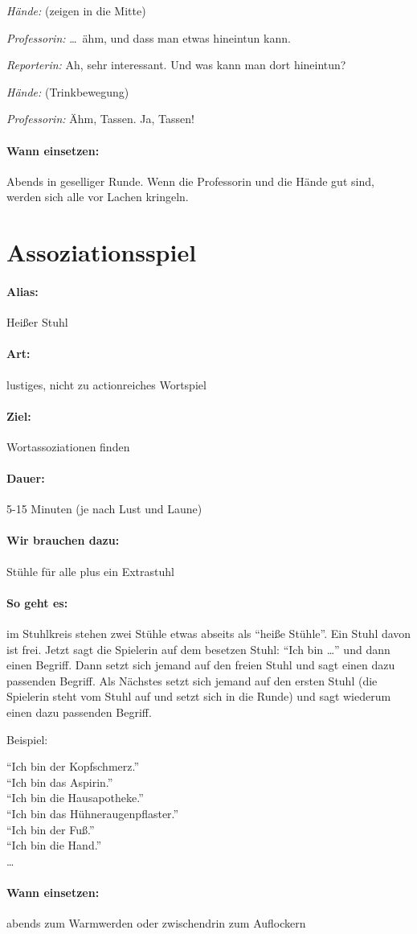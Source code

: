 \emph{Hände:} (zeigen in die Mitte)

\emph{Professorin:} \ldots\ ähm, und dass man etwas hineintun kann.

\emph{Reporterin:} Ah, sehr interessant. Und was kann man dort hineintun?

\emph{Hände:} (Trinkbewegung)

\emph{Professorin:} Ähm, Tassen. Ja, Tassen!

\paragraph{Wann einsetzen:} Abends in geselliger Runde. Wenn die Professorin und die Hände gut sind, werden sich alle vor Lachen kringeln.


\section{Assoziationsspiel}
\paragraph{Alias:} Heißer Stuhl
\paragraph{Art:} lustiges, nicht zu actionreiches Wortspiel
\paragraph{Ziel:} Wortassoziationen finden
\paragraph{Dauer:} 5-15 Minuten (je nach Lust und Laune)
\paragraph{Wir brauchen dazu:} Stühle für alle plus ein Extrastuhl
\paragraph{So geht es:} im Stuhlkreis stehen zwei Stühle etwas abseits als "`heiße Stühle"'. Ein Stuhl davon ist frei. Jetzt sagt die Spielerin auf dem besetzen Stuhl: "`Ich bin \ldots"' und dann einen Begriff. Dann setzt sich jemand auf den freien Stuhl und sagt einen dazu passenden Begriff. Als Nächstes setzt sich jemand auf den ersten Stuhl (die Spielerin steht vom Stuhl auf und setzt sich in die Runde) und sagt wiederum einen dazu passenden Begriff.

Beispiel:

"`Ich bin der Kopfschmerz."'\\
"`Ich bin das Aspirin."'\\
"`Ich bin die Hausapotheke."'\\
"`Ich bin das Hühneraugenpflaster."'\\
"`Ich bin der Fuß."'\\
"`Ich bin die Hand."'\\
\ldots
\paragraph{Wann einsetzen:} abends zum Warmwerden oder zwischendrin zum Auflockern


